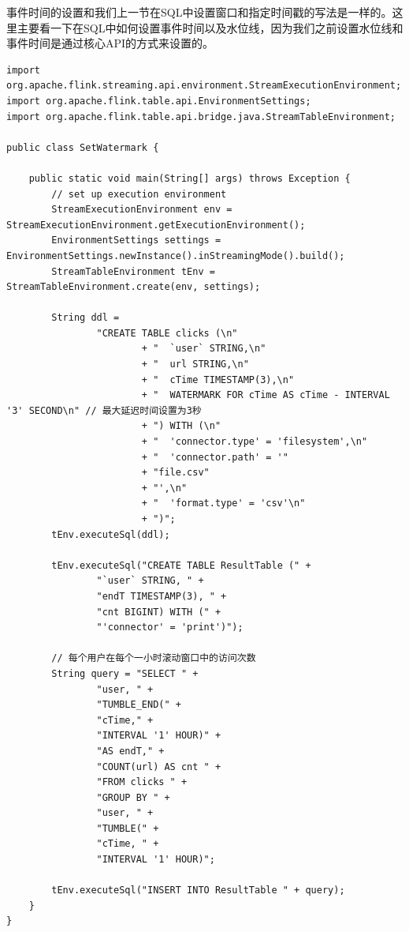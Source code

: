 \documentclass[cn,11pt,chinese]{elegantbook}
\begin{document}
事件时间的设置和我们上一节在SQL中设置窗口和指定时间戳的写法是一样的。这里主要看一下在SQL中如何设置事件时间以及水位线，因为我们之前设置水位线和事件时间是通过核心API的方式来设置的。

\begin{verbatim}
import org.apache.flink.streaming.api.environment.StreamExecutionEnvironment;
import org.apache.flink.table.api.EnvironmentSettings;
import org.apache.flink.table.api.bridge.java.StreamTableEnvironment;

public class SetWatermark {

    public static void main(String[] args) throws Exception {
        // set up execution environment
        StreamExecutionEnvironment env = StreamExecutionEnvironment.getExecutionEnvironment();
        EnvironmentSettings settings = EnvironmentSettings.newInstance().inStreamingMode().build();
        StreamTableEnvironment tEnv = StreamTableEnvironment.create(env, settings);

        String ddl =
                "CREATE TABLE clicks (\n"
                        + "  `user` STRING,\n"
                        + "  url STRING,\n"
                        + "  cTime TIMESTAMP(3),\n"
                        + "  WATERMARK FOR cTime AS cTime - INTERVAL '3' SECOND\n" // 最大延迟时间设置为3秒
                        + ") WITH (\n"
                        + "  'connector.type' = 'filesystem',\n"
                        + "  'connector.path' = '"
                        + "file.csv"
                        + "',\n"
                        + "  'format.type' = 'csv'\n"
                        + ")";
        tEnv.executeSql(ddl);

        tEnv.executeSql("CREATE TABLE ResultTable (" +
                "`user` STRING, " +
                "endT TIMESTAMP(3), " +
                "cnt BIGINT) WITH (" +
                "'connector' = 'print')");

        // 每个用户在每个一小时滚动窗口中的访问次数
        String query = "SELECT " +
                "user, " +
                "TUMBLE_END(" +
                "cTime," +
                "INTERVAL '1' HOUR)" +
                "AS endT," +
                "COUNT(url) AS cnt " +
                "FROM clicks " +
                "GROUP BY " +
                "user, " +
                "TUMBLE(" +
                "cTime, " +
                "INTERVAL '1' HOUR)";

        tEnv.executeSql("INSERT INTO ResultTable " + query);
    }
}
\end{verbatim}
\end{document}
